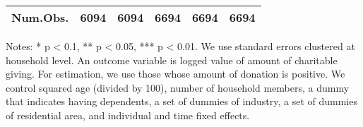 \begin{table}
\begin{threeparttable}
\begin{tabular}[t]{lccccc}
Num.Obs. & \num{6094} & \num{6094} & \num{6694} & \num{6694} & \num{6694}\\
\bottomrule
\end{tabular}
\begin{tablenotes}
\item Notes: * p < 0.1, ** p < 0.05, *** p < 0.01. We use standard errors clustered at household level. An outcome variable is logged value of amount of charitable giving. For estimation, we use those whose amount of donation is positive. We control squared age (divided by 100), number of household members, a dummy that indicates having dependents, a set of dummies of industry, a set of dummies of residential area, and individual and time fixed effects.
\end{tablenotes}
\end{threeparttable}
\end{table}
